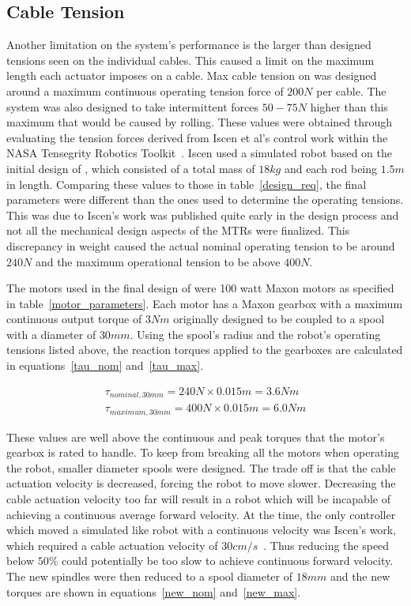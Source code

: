 \begin{appendices}
\subsection{Cable Tension}
\label{sec:cable_tension}
Another limitation on the system's performance is the larger than designed tensions seen on the individual cables.
This caused a limit on the maximum length each actuator imposes on a cable. 
Max cable tension on \SB{} was designed around a maximum continuous operating tension force of \(200N\) per cable.
The system was also designed to take intermittent forces \(50-75N\) higher than this maximum that would be caused by rolling.
These values were obtained through evaluating the tension forces derived from Iscen et al's control work within the NASA Tensegrity Robotics Toolkit~\cite{iscen2014flop}.
Iscen used a simulated robot based on the initial design of \SB{}, which consisted of a total mass of \(18kg\) and each rod being \(1.5m\) in length. 
Comparing these values to those in table~\ref{design_req}, the final \SB{} parameters were different than the ones used to determine the operating tensions.
This was due to Iscen's work was published quite early in the design process and not all the mechanical design aspects of the MTRs were finalized.
This discrepancy in weight caused the actual nominal operating tension to be around \(240N\) and the maximum operational tension to be above \(400N\).

The motors used in the final design of \SB{} were 100 watt Maxon motors as specified in table~\ref{motor_parameters}.
Each motor has a Maxon gearbox with a maximum continuous output torque of \(3Nm\) originally designed to be coupled to a spool with a diameter of \(30mm\).
Using the spool's radius and the robot's operating tensions listed above, the reaction torques applied to the gearboxes are calculated in equations~\ref{tau_nom} and~\ref{tau_max}.

\begin{align}
\tau_{nominal, 30mm} = 240N \times 0.015m = 3.6Nm \label{tau_nom} \\
\tau_{maximum, 30mm} = 400N \times 0.015m = 6.0Nm \label{tau_max}
\end{align}

These values are well above the continuous and peak torques that the motor's gearbox is rated to handle.
To keep from breaking all the motors when operating the robot, smaller diameter spools were designed. 
The trade off is that the cable actuation velocity is decreased, forcing the robot to move slower.
Decreasing the cable actuation velocity too far will result in a robot which will be incapable of achieving a continuous average forward velocity.
At the time, the only controller which moved a simulated \SB{} like robot with a continuous velocity was Iscen's work, which required a cable actuation velocity of \(30 cm/s\)~\cite{iscen2014flop}.
Thus reducing the speed below \(50\%\) could potentially be too slow to achieve continuous forward velocity.
The new spindles were then reduced to a spool diameter of \(18mm\) and the new torques are shown in equations~\ref{new_nom} and~\ref{new_max}.


\end{appendices}

